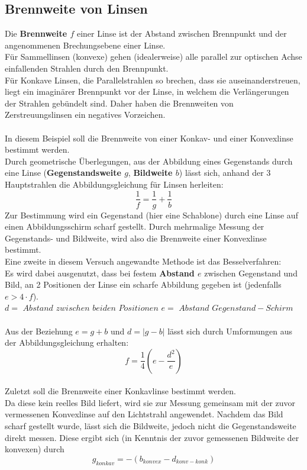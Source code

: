 \documentclass[12pt,a4paper]{article}
\begin{document}
\pagebreak
\setlength{\columnsep}{20pt}
\begin{multicols}{2}

\section{Brennweite von Linsen}
Die \textbf{Brennweite $f $} einer Linse ist der Abstand zwischen Brennpunkt und der angenommenen Brechungsebene einer Linse. \\
Für Sammellinsen (konvexe) gehen (idealerweise) alle parallel zur optischen Achse einfallenden Strahlen durch den Brennpunkt.\\
Für Konkave Linsen, die Parallelstrahlen so brechen, dass sie auseinanderstreuen, liegt ein imaginärer Brennpunkt vor der Linse, in welchem die Verlängerungen der Strahlen gebündelt sind. Daher haben die Brennweiten von Zerstreuungslinsen ein negatives Vorzeichen.\\
\\
In diesem Beispiel soll die Brennweite von einer Konkav- und einer Konvexlinse bestimmt werden.\\
Durch geometrische Überlegungen, aus der Abbildung eines Gegenstands durch eine Linse (\textbf{Gegenstandsweite $g$}, \textbf{Bildweite $b$}) lässt sich, anhand der 3 Hauptstrahlen die Abbildungsgleichung für Linsen herleiten:
$$\frac{1}{f}=\frac{1}{g}+ \frac{1}{b}$$
Zur Bestimmung wird ein Gegenstand (hier eine Schablone) durch eine Linse auf einen Abbildungsschirm scharf gestellt. Durch mehrmalige Messung der Gegenstands- und Bildweite, wird also die Brennweite einer Konvexlinse bestimmt.\\
Eine zweite in diesem Versuch angewandte Methode ist das Besselverfahren:\\
Es wird dabei ausgenutzt, dass bei festem \textbf{Abstand $e$} zwischen Gegenstand und Bild, an 2 Positionen der Linse ein scharfe Abbildung gegeben ist (jedenfalls $e > 4\cdot f$).\\
$d =$ $Abstand$ $zwischen$ $beiden$ $Positionen$
$e=$ $Abstand$ $Gegenstand-Schirm$\\
\\
Aus der Beziehung $e = g + b$ und $d=|g-b|$ lässt sich durch Umformungen aus der Abbildungsgleichung erhalten:
$$f=\frac{1}{4} \left(e-\frac{d^2}{e} \right)$$
\\
Zuletzt soll die Brennweite einer Konkavlinse bestimmt werden.\\
Da diese kein reelles Bild liefert, wird sie zur Messung gemeinsam mit der zuvor vermessenen Konvexlinse auf den Lichtstrahl angewendet. Nachdem das Bild scharf gestellt wurde, lässt sich die Bildweite, jedoch nicht die Gegenstandsweite direkt messen. Diese ergibt sich (in Kenntnis der zuvor gemessenen Bildweite der konvexen) durch
$$g_{konkav}= -(b_{konvex}-d_{konv-konk})$$



\end{multicols}
\end{document}
